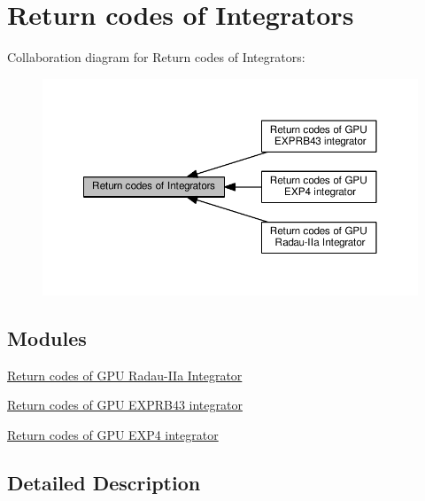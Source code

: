 \hypertarget{group__CUErrorCodes}{}\section{Return codes of Integrators}
\label{group__CUErrorCodes}
Collaboration diagram for Return codes of Integrators\+:\nopagebreak
\begin{figure}[H]
\begin{center}
\leavevmode
\includegraphics[width=350pt]{group__CUErrorCodes}
\end{center}
\end{figure}
\subsection*{Modules}
\begin{DoxyCompactItemize}
\item 
\hyperlink{group__RKCU__ErrCodes}{Return codes of G\+P\+U Radau-\/\+I\+Ia Integrator}
\item 
\hyperlink{group__exp4cu__ErrCodes}{Return codes of G\+P\+U E\+X\+P\+R\+B43 integrator}
\item 
\hyperlink{group__exprb43cu__ErrCodes}{Return codes of G\+P\+U E\+X\+P4 integrator}
\end{DoxyCompactItemize}


\subsection{Detailed Description}
